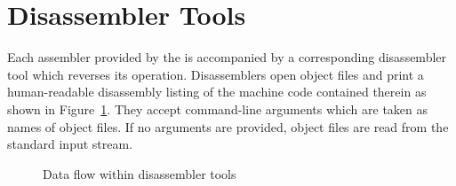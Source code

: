 \asmprint
\amdaasm
\amdbasm
\amdcasm
\armaasm
\armbasm
\armcasm
\avrasm
\avrttasm
\mabkasm
\miblasm
\mipsaasm
\mipsbasm
\mmixasm
\orokasm
\ppcaasm
\ppcbasm
\riscasm
\wasmasm
\xtensaasm

\section{Disassembler Tools}

Each assembler provided by the \ecs{} is accompanied by a corresponding disassembler tool which reverses its operation.
Disassemblers open object files and print a human-readable disassembly listing of the machine code contained therein as shown in Figure~\ref{fig:dismdataflow}.
They accept command-line arguments which are taken as names of object files.
If no arguments are provided, object files are read from the standard input stream.
\seeinterface\seeguide

\begin{figure}
\caption{Data flow within disassembler tools}
\label{fig:dismdataflow}
\end{figure}

\amdadism
\amdbdism
\amdcdism
\armadism
\armbdism
\armcdism
\avrdism
\avrttdism
\mabkdism
\mibldism
\mipsadism
\mipsbdism
\mmixdism
\orokdism
\ppcadism
\ppcbdism
\riscdism
\wasmdism
\xtensadism

\concludechapter
